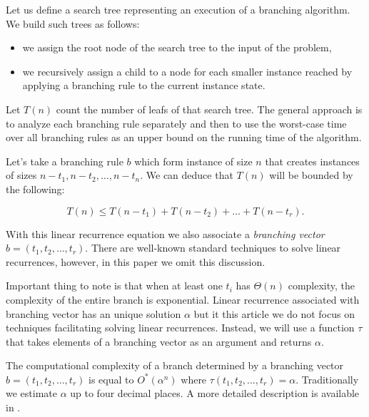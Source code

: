 Let us define a search tree representing an execution of a branching algorithm. We build such trees as follows:
\begin{itemize}
    \item we assign the root node of the search tree to the input of the problem,
    \item we recursively assign a child to a node for each smaller instance reached by applying a branching rule to the current instance state.
\end{itemize}

Let $T(n)$ count the number of leafs of that search tree.
The general approach is to analyze each branching rule separately and then to use the worst-case time over all branching rules as an upper bound on the running time of the algorithm.

Let's take a branching rule $b$ which form instance of size $n$ that creates instances of sizes $n-t_1, n-t_2, \ldots, n-t_n$. We can deduce that $T(n)$ will be bounded by the following:

$$T(n) \leq T(n-t_1) +T(n-t_2) + \ldots +T(n-t_r).$$

With this linear recurrence equation we also associate a \emph{branching vector} $b=(t_1, t_2, \ldots, t_r)$. There are well-known standard techniques to solve linear recurrences, however, in this paper we omit this discussion. 

Important thing to note is that when at least one $t_i$ has $\Theta(n)$ complexity, the complexity of the entire branch is exponential. Linear recurrence associated with branching vector has an unique solution $\alpha$ but it this article we do not focus on techniques facilitating solving linear recurrences. Instead, we will use a function $\tau$ that takes elements of a branching vector as an argument and returns $\alpha$. 

The computational complexity of a branch determined by a branching vector $b=(t_1, t_2, \ldots, t_r)$ is equal to
$O^*(\alpha^n)$ where $\tau(t_1, t_2, \ldots, t_r) = \alpha$. Traditionally we estimate $\alpha$ up to four decimal places. A more detailed description is available in \cite{book}.
